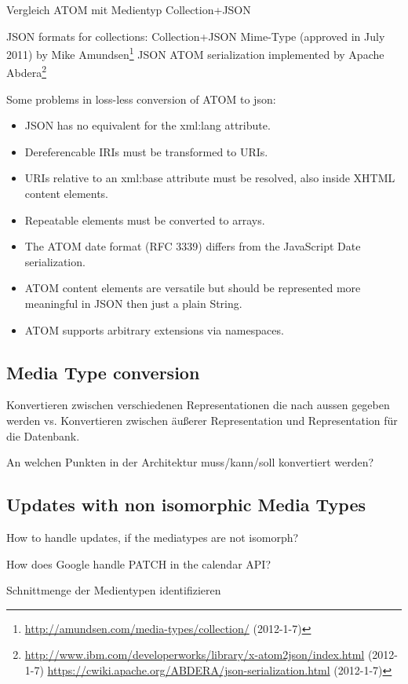 \documentclass[12pt,a4paper]{scrartcl}		%
\newcommand{\citeurl}[2]{\url{#1} (#2)}
\begin{document}
Vergleich ATOM mit Medientyp Collection+JSON

JSON formats for collections:
Collection+JSON Mime-Type (approved in July 2011) by Mike Amundsen\footnote{\citeurl{http://amundsen.com/media-types/collection/}{2012-1-7}}
JSON ATOM serialization implemented by Apache Abdera\footnote{\citeurl{http://www.ibm.com/developerworks/library/x-atom2json/index.html}{2012-1-7} \citeurl{https://cwiki.apache.org/ABDERA/json-serialization.html}{2012-1-7}}


Some problems in loss-less conversion of ATOM to json:\cite{Snell2008}
\begin{itemize}
  \item JSON has no equivalent for the xml:lang attribute.
  \item Dereferencable IRIs must be transformed to URIs.
  \item URIs relative to an xml:base attribute must be resolved, also inside XHTML content elements.
  \item Repeatable elements must be converted to arrays.
  \item The ATOM date format (RFC 3339) differs from the JavaScript Date serialization.
  \item ATOM content elements are versatile but should be represented more meaningful in JSON then just a plain String.
  \item ATOM supports arbitrary extensions via namespaces.
\end{itemize}

\subsection{Media Type conversion}

Konvertieren zwischen verschiedenen Representationen die nach aussen gegeben werden vs. Konvertieren zwischen äußerer Representation und Representation für die Datenbank.

An welchen Punkten in der Architektur muss/kann/soll konvertiert werden?

\subsection{Updates with non isomorphic Media Types}
How to handle updates, if the mediatypes are not isomorph?

How does Google handle PATCH in the calendar API?

Schnittmenge der Medientypen identifizieren
\end{document}

